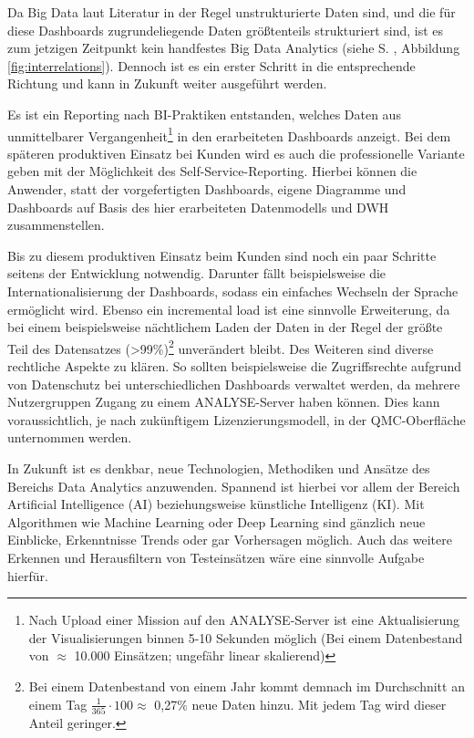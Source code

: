 Da Big Data laut Literatur \cite{Fischer.2014, Hausler.2018} in der Regel unstrukturierte Daten sind, und die für diese Dashboards zugrundeliegende Daten größtenteils strukturiert sind, ist es zum jetzigen Zeitpunkt kein handfestes \glqq Big Data Analytics\grqq{} (siehe  S. \pageref{fig:interrelations}, Abbildung \ref{fig:interrelations}).
Dennoch ist es ein erster Schritt in die entsprechende Richtung und kann in Zukunft weiter ausgeführt werden.

Es ist ein Reporting nach \gls{BI}-Praktiken entstanden, welches Daten aus unmittelbarer Vergangenheit\footnote{Nach Upload einer Mission auf den \gls{ANALYSE}-Server ist eine Aktualisierung der Visualisierungen binnen 5-10 Sekunden möglich (Bei einem Datenbestand von $\approx$ 10.000 Einsätzen; ungefähr linear skalierend)} in den erarbeiteten Dashboards anzeigt.
Bei dem späteren produktiven Einsatz bei Kunden wird es auch die professionelle Variante geben mit der Möglichkeit des Self-Service-Reporting.
Hierbei können die Anwender, statt der vorgefertigten Dashboards, eigene Diagramme und Dashboards auf Basis des hier erarbeiteten Datenmodells und \gls{DWH} zusammenstellen.

Bis zu diesem produktiven Einsatz beim Kunden sind noch ein paar Schritte seitens der Entwicklung notwendig.
Darunter fällt beispielsweise die Internationalisierung der Dashboards, sodass ein einfaches Wechseln der Sprache ermöglicht wird.
Ebenso ein \glqq incremental load\grqq{} ist eine sinnvolle Erweiterung, da bei einem beispielsweise nächtlichem Laden der Daten in der Regel der größte Teil des Datensatzes (>99\%)\footnote{Bei einem Datenbestand von einem Jahr kommt demnach im Durchschnitt an einem Tag 
$\frac{1}{365} \cdot100 \approx$ 0,27\% neue Daten hinzu. Mit jedem Tag wird dieser Anteil geringer.}  unverändert bleibt.
Des Weiteren sind diverse rechtliche Aspekte zu klären.
So sollten beispielsweise die Zugriffsrechte aufgrund von Datenschutz bei unterschiedlichen Dashboards verwaltet werden, da mehrere Nutzergruppen Zugang zu einem \gls{ANALYSE}-Server haben können.
Dies kann voraussichtlich, je nach zukünftigem Lizenzierungsmodell, in der \gls{QMC}-Oberfläche unternommen werden.

In Zukunft ist es denkbar, neue Technologien, Methodiken und Ansätze des Bereichs \glqq Data Analytics\grqq{} anzuwenden.
Spannend ist hierbei vor allem der Bereich \glqq Artificial Intelligence\grqq{} (AI) beziehungsweise künstliche Intelligenz (KI).
Mit Algorithmen wie \glqq Machine Learning\grqq{} oder \glqq Deep Learning\grqq{} sind gänzlich neue Einblicke, Erkenntnisse Trends oder gar Vorhersagen möglich.
Auch das weitere Erkennen und Herausfiltern von Testeinsätzen wäre eine sinnvolle Aufgabe hierfür.

